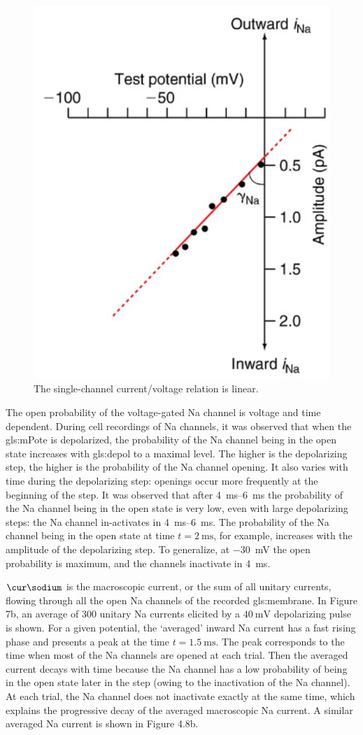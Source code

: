 \documentclass[class={.NoTouch/myProject}, crop=false]{standalone}
\begin{document}
\begin{figure}[H]
    \centering
    \includegraphics[width=0.5\linewidth]{Pictures//Anakin/iNa-VNa.png}
    \caption{The single-channel current/voltage \br{\unit[per-mode = symbol]{\cur\sodium\per\volt}} relation is linear. }
    \label{fig:enter-label}
\end{figure}
The open probability of the voltage-gated \gls{Na} channel is voltage and time dependent. During cell recordings of \gls{Na} channels, it was observed that when the \gls{gls:mPote} is depolarized, the probability of the \gls{Na} channel being in the open state increases with \gls{gls:depol} to a maximal level. The higher is the depolarizing step, the higher is the probability of the \gls{Na} channel opening. It also varies with time during the depolarizing step: openings occur more frequently at the beginning of the step. It was observed  that after \qtyrange{4}{6}{\ms} the probability of the \gls{Na} channel being in the open state is very low, even with large depolarizing steps: the \gls{Na} channel in-activates in \qtyrange{4}{6}{\ms}.  The probability of the \gls{Na} channel being in the open state at time \(t=\qty{2}{\ms}\), for example, increases with the amplitude of the depolarizing step. To generalize, at \qty{-30}{\mV} the open probability is maximum, and the channels inactivate in \qty{4}{\ms}. 

\(\unit{\cur\sodium}\) is the macroscopic current, or the sum of all unitary currents, \unit{\cur\sodium} flowing through all the open \gls{Na} channels of the recorded \gls{gls:membrane}. In Figure 7b, an average of \(\num{300}\) unitary \gls{Na} currents elicited by a \(\qty{40}{\mV}\) depolarizing pulse is shown. For a given potential, the `averaged' inward \gls{Na} current has a fast rising phase and presents a peak at the time \(t=\qty{1.5}{\ms}\). The peak corresponds to the time when most of the \gls{Na} channels are opened at each trial. Then the averaged current decays with time because the \gls{Na} channel has a low probability of being in the open state later in the step (owing to the inactivation of the \gls{Na} channel). At each trial, the \gls{Na} channel does not inactivate exactly at the same time, which explains the progressive decay of the averaged macroscopic \gls{Na} current. A similar averaged \gls{Na} current is shown in Figure 4.8b. %
\end{document}

